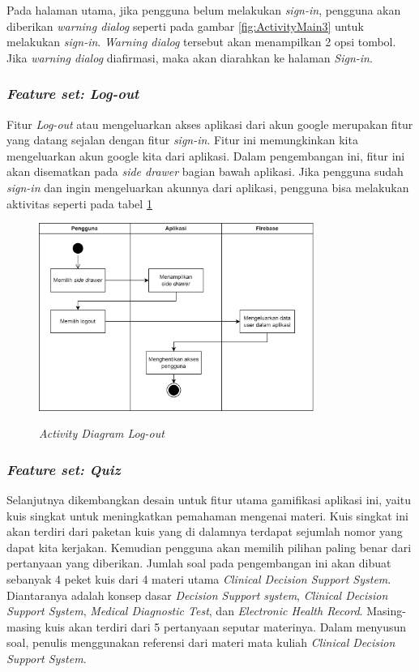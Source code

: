 Pada halaman utama, jika pengguna belum melakukan \textit{sign-in}, pengguna akan diberikan \textit{warning dialog} seperti pada gambar \ref*{fig:ActivityMain3} untuk melakukan \textit{sign-in}.
\textit{Warning dialog} tersebut akan menampilkan 2 opsi tombol. Jika \textit{warning dialog} diafirmasi, maka akan diarahkan ke halaman \textit{Sign-in}.
\subsubsection{\textit{Feature set: Log-out}}
Fitur \textit{Log-out} atau mengeluarkan akses aplikasi dari akun google merupakan fitur yang datang sejalan dengan fitur \textit{sign-in}.
Fitur ini memungkinkan kita mengeluarkan akun google kita dari aplikasi. Dalam pengembangan ini, fitur ini akan disematkan pada \textit{side drawer} bagian bawah aplikasi.
Jika pengguna sudah \textit{sign-in} dan ingin mengeluarkan akunnya dari aplikasi, pengguna bisa melakukan aktivitas seperti pada tabel \ref*{Fig:ActivityOut}
\begin{figure}[H]
	\centering
	\caption{\textit{Activity Diagram Log-out}}
	\includegraphics[width=0.8\textwidth]{contents/chapter-3/images/AD-signout.png}
	\label{Fig:ActivityOut}
\end{figure}
\subsubsection{\textit{Feature set: Quiz}}
Selanjutnya dikembangkan desain untuk fitur utama gamifikasi aplikasi ini, yaitu kuis singkat untuk meningkatkan pemahaman mengenai materi.
Kuis singkat ini akan terdiri dari paketan kuis yang di dalamnya terdapat sejumlah nomor yang dapat kita kerjakan. Kemudian pengguna akan memilih pilihan paling benar dari pertanyaan yang diberikan.
Jumlah soal pada pengembangan ini akan dibuat sebanyak 4 peket kuis dari 4 materi utama \textit{Clinical Decision Support System}. Diantaranya adalah konsep dasar \textit{Decision Support system}, \textit{Clinical Decision Support System}, \textit{Medical Diagnostic Test}, dan \textit{Electronic Health Record}.
Masing-masing kuis akan terdiri dari 5 pertanyaan seputar materinya. Dalam menyusun soal, penulis menggunakan referensi dari materi mata kuliah \textit{Clinical Decision Support System}.

